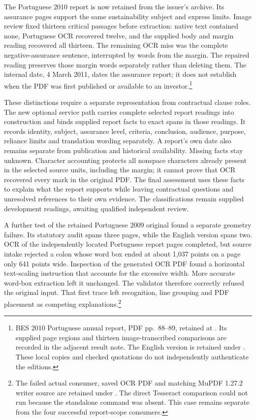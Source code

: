The Portuguese 2010 report is now retained from the issuer's archive.  Its
assurance pages support the same sustainability subject and express limits.
Image review fixed thirteen critical passages before extraction: native text
contained none, Portuguese OCR recovered twelve, and the supplied body and
margin reading recovered all thirteen.  The remaining OCR miss was the complete
negative-assurance sentence, interrupted by words from the margin.  The repaired
reading preserves those margin words separately rather than deleting them.
The internal date, 4 March 2011, dates the assurance report; it does not establish
when the PDF was first published or available to an investor.\footnote{BES
2010 Portuguese annual report, PDF pp.~88--89, retained at
.
Its supplied page regions and thirteen image-transcribed comparisons are
recorded in the adjacent result note.  The English version is retained under
.  These local copies and checked
quotations do not independently authenticate the editions.}

These distinctions require a separate representation from contractual clause
roles.  The new optional service path carries complete selected report readings
into construction and binds supplied report facts to exact spans in those
readings.  It records identity, subject, assurance level, criteria, conclusion,
audience, purpose, reliance limits and translation wording separately.  A
report's own date also remains separate from publication and historical
availability.  Missing facts stay unknown.  Character accounting protects all
nonspace characters already present in the selected source units, including
the margin; it cannot prove that OCR recovered every mark in the original PDF.
The final assessment uses these facts to explain what the report supports while
leaving contractual questions and unresolved references to their own evidence.
The classifications remain supplied development readings, awaiting qualified
independent review.

A further test of the retained Portuguese 2009 original found a separate
geometry failure.  Its statutory audit spans three pages, while the English
version spans two.  OCR of the independently located Portuguese report pages
completed, but source intake rejected a colon whose word box ended at about
1,037 points on a page only 641 points wide.  Inspection of the generated OCR
PDF found a horizontal text-scaling instruction that accounts for the excessive
width.  More accurate word-box extraction left it unchanged.  The validator
therefore correctly refused the original input.  That first trace left
recognition, line grouping and PDF placement as competing explanations.\footnote{The
failed actual consumer, saved OCR PDF and matching MuPDF 1.27.2 writer source
are retained under
.
The direct Tesseract comparison could not run because the standalone command
was absent.  This case remains separate from the four successful report-scope
consumers.}

